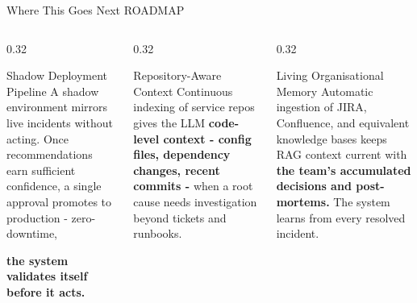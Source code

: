 \documentclass[aspectratio=169,10pt]{beamer}
\newcommand{\slidecat}[1]{{\color{cdim}\ttfamily\scriptsize\MakeUppercase{#1}}}
\begin{document}
\begin{frame}{Where This Goes Next}
  \slidecat{Roadmap}
  \vspace{0.2cm}
  \begin{columns}[T]
    \begin{column}{0.32\textwidth}
      \begin{block}{\color{cteal}\ttfamily\tiny Shadow Deployment Pipeline}
        {\footnotesize A shadow environment mirrors live incidents without acting. Once recommendations earn sufficient confidence, a single approval promotes to production - zero-downtime,}
        \par{\color{cauto}\footnotesize\bfseries the system validates itself before it acts.}
      \end{block}
    \end{column}
    \begin{column}{0.32\textwidth}
      \begin{block}{\color{cteal}\ttfamily\tiny Repository-Aware Context}
        {\footnotesize Continuous indexing of service repos gives the LLM }
        {\color{cauto}\footnotesize\bfseries code-level context - config files, dependency changes, recent commits -}
        {\footnotesize when a root cause needs investigation beyond tickets and runbooks.}
      \end{block}
    \end{column}
    \begin{column}{0.32\textwidth}
      \begin{block}{\color{cteal}\ttfamily\tiny Living Organisational Memory}
        {\footnotesize Automatic ingestion of JIRA, Confluence, and equivalent knowledge bases keeps RAG context current with }
        {\color{cauto}\footnotesize\bfseries the team's accumulated decisions and post-mortems.}
        {\footnotesize The system learns from every resolved incident.}
      \end{block}
    \end{column}
  \end{columns}
\end{frame}


\end{document}
